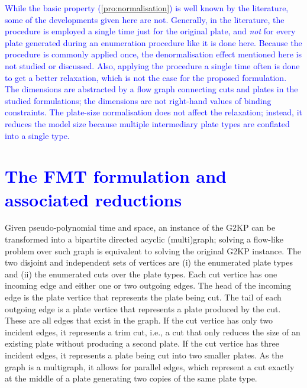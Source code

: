 \documentclass[ppgc,tese,english,formais,babel]{iiufrgs}
\newif\iffinalversion
\newcommand{\newtext}[1]{\iffinalversion%
#1%
\else%
\textcolor{blue}{#1}%
\fi%
}
\begin{document}
\newtext{
While the basic property (\cref{pro:normalisation}) is well known by the literature, some of the developments given here are not.
Generally, in the literature, the procedure is employed a single time just for the original plate, and \emph{not} for every plate generated during an enumeration procedure like it is done here.
Because the procedure is commonly applied once, the denormalisation effect mentioned here is not studied or discussed.
Also, applying the procedure a single time often is done to get a better relaxation, which is not the case for the proposed formulation.
The dimensions are abstracted by a flow graph connecting cuts and plates in the studied formulations; the dimensions are not right-hand values of binding constraints.
The plate-size normalisation does not affect the relaxation; instead, it reduces the model size because multiple intermediary plate types are conflated into a single type.
}


\section{\newtext{The FMT formulation and associated reductions}}
\label{sec:furini_model}

Given pseudo-polynomial time and space, an instance of the G2KP can be transformed into a bipartite directed acyclic (multi)graph; solving a flow-like problem over such graph is equivalent to solving the original G2KP instance.
The two disjoint and independent sets of vertices are (i) the enumerated plate types and (ii) the enumerated cuts over the plate types.
Each cut vertice has one incoming edge and either one or two outgoing edges.
The head of the incoming edge is the plate vertice that represents the plate being cut.
The tail of each outgoing edge is a plate vertice that represents a plate produced by the cut.
These are all edges that exist in the graph.
If the cut vertice has only two incident edges, it represents a trim cut, i.e., a cut that only reduces the size of an existing plate without producing a second plate.
If the cut vertice has three incident edges, it represents a plate being cut into two smaller plates.
As the graph is a multigraph, it allows for parallel edges, which represent a cut exactly at the middle of a plate generating two copies of the same plate type.
\end{document}
